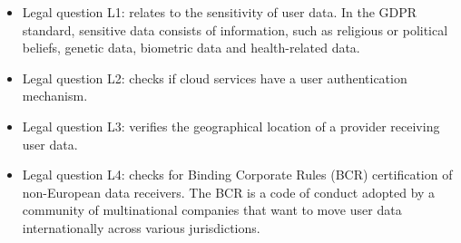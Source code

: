 \documentclass[11pt,english]{article}
\begin{document}
\begin{itemize}
    \item Legal question L1: relates to the sensitivity of user data. In the GDPR standard, sensitive data consists of information, such as religious or political beliefs, genetic data, biometric data and health-related data.
    \item Legal question L2: checks if cloud services have a user
authentication mechanism.
    \item Legal question L3: veriﬁes the geographical location of a
provider receiving user data.
    \item Legal question L4: checks for Binding Corporate Rules
(BCR) certiﬁcation of non-European data receivers. The BCR is a code of conduct adopted by a community of multinational companies that want to move user data internationally across various jurisdictions.
\end{itemize}
\end{document}
